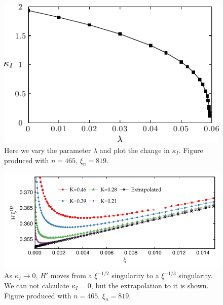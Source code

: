 \documentclass{jfm}
\begin{document}
\begin{figure}
  \centerline{\includegraphics{./../../Graphs/K-lambda-edited.pdf}}
  \caption{Here we vary the parameter $\lambda$ and plot the change in 
           $\kappa_I$. Figure produced with $n=465$,
           $\xi_n = 819$.}\label{fig:K-lambda-edited}
\end{figure}
\begin{figure}
  \centerline{\includegraphics{./../../Graphs/hprime-x.pdf}}\label{fig:hprime-x}
  \caption{As $\kappa_I\to 0$, $H'$ moves from a $\xi^{-1/2}$ singularity
           to a $\xi^{-1/3}$ singularity. We can not calculate $\kappa_I=0$, 
           but the extrapolation to it is shown. Figure produced with $n=465$,
           $\xi_n = 819$.}
\end{figure}
\end{document}
